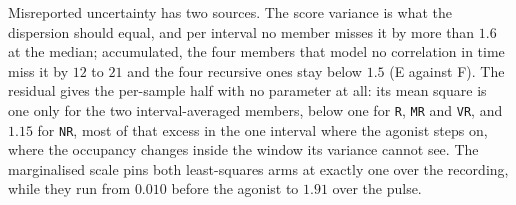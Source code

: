 Misreported uncertainty has two sources. The score variance is what the dispersion should equal, and
per interval no member misses it by more than $1.6$ at the median; accumulated, the four members
that model no correlation in time miss it by $12$ to $21$ and the four recursive ones stay below
$1.5$ (E against F). The residual gives the per-sample half with no parameter at all: its mean
square is one only for the two interval-averaged members, below one for \texttt{R}, \texttt{MR} and
\texttt{VR}, and $1.15$ for \texttt{NR}, most of that excess in the one interval where the agonist
steps on, where the occupancy changes inside the window its variance cannot see. The marginalised
scale pins both least-squares arms at exactly one over the recording, while they run from $0.010$
before the agonist to $1.91$ over the pulse.

